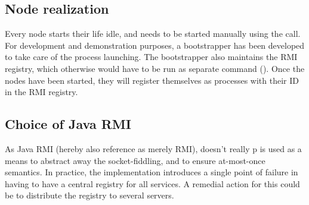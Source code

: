 \documentclass[10pt,a4paper]{article}
\begin{document}
\subsection{Node realization}
Every node starts their life idle, and needs to be started manually using the  call. For development and demonstration purposes, a bootstrapper has been developed to take care of the process launching. The bootstrapper also maintains the RMI registry, which otherwise would have to be run as separate command ().
Once the nodes have been started, they will register themselves as processes with their ID in the RMI registry.



\subsection{Choice of Java RMI}
As Java RMI (hereby also reference as merely RMI), doesn't really p
is used as a means to abstract away the socket-fiddling, and to ensure at-most-once semantics. In practice, the implementation introduces a single point of failure in having to have a central registry for all services. A remedial action for this could be to distribute the registry to several servers.
\end{document}
